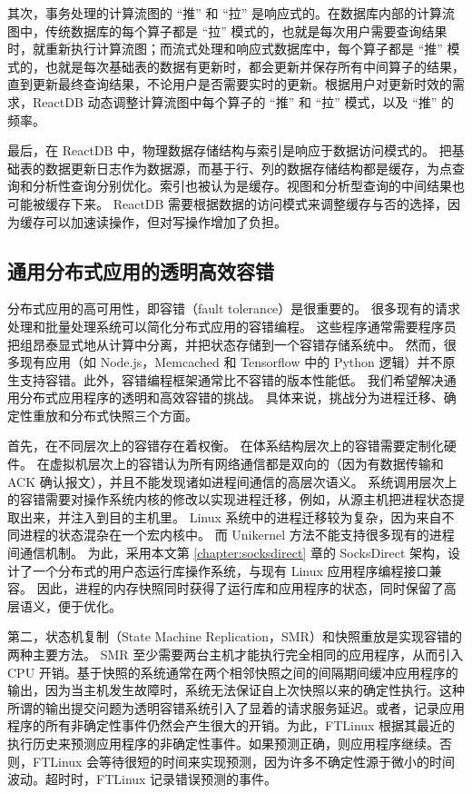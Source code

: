 其次，事务处理的计算流图的 ``推'' 和 ``拉'' 是响应式的。在数据库内部的计算流图中，传统数据库的每个算子都是 ``拉'' 模式的，也就是每次用户需要查询结果时，就重新执行计算流图；而流式处理和响应式数据库中，每个算子都是 ``推'' 模式的，也就是每次基础表的数据有更新时，都会更新并保存所有中间算子的结果，直到更新最终查询结果，不论用户是否需要实时的更新。根据用户对更新时效的需求，ReactDB 动态调整计算流图中每个算子的 ``推'' 和 ``拉'' 模式，以及 ``推'' 的频率。

最后，在 ReactDB 中，物理数据存储结构与索引是响应于数据访问模式的。
把基础表的数据更新日志作为数据源，而基于行、列的数据存储结构都是缓存，为点查询和分析性查询分别优化。索引也被认为是缓存。视图和分析型查询的中间结果也可能被缓存下来。
ReactDB 需要根据数据的访问模式来调整缓存与否的选择，因为缓存可以加速读操作，但对写操作增加了负担。

\subsection{通用分布式应用的透明高效容错}

分布式应用的高可用性，即容错（fault tolerance）是很重要的。
很多现有的请求处理和批量处理系统可以简化分布式应用的容错编程。
这些程序通常需要程序员把组昂泰显式地从计算中分离，并把状态存储到一个容错存储系统中。
然而，很多现有应用（如 Node.js，Memcached 和 Tensorflow 中的 Python 逻辑）并不原生支持容错。此外，容错编程框架通常比不容错的版本性能低。
我们希望解决通用分布式应用程序的透明和高效容错的挑战。
具体来说，挑战分为进程迁移、确定性重放和分布式快照三个方面。

首先，在不同层次上的容错存在着权衡。
在体系结构层次上的容错需要定制化硬件。
在虚拟机层次上的容错认为所有网络通信都是双向的（因为有数据传输和 ACK 确认报文），并且不能发现诸如进程间通信的高层次语义。
系统调用层次上的容错需要对操作系统内核的修改以实现进程迁移，例如，从源主机把进程状态提取出来，并注入到目的主机里。
Linux 系统中的进程迁移较为复杂，因为来自不同进程的状态混杂在一个宏内核中。
而 Unikernel 方法不能支持很多现有的进程间通信机制。
为此，采用本文第 \ref{chapter:socksdirect} 章的 SocksDirect 架构，设计了一个分布式的用户态运行库操作系统，与现有 Linux 应用程序编程接口兼容。
因此，进程的内存快照同时获得了运行库和应用程序的状态，同时保留了高层语义，便于优化。

第二，状态机复制（State Machine Replication，SMR）和快照重放是实现容错的两种主要方法。 SMR 至少需要两台主机才能执行完全相同的应用程序，从而引入 CPU 开销。基于快照的系统通常在两个相邻快照之间的间隔期间缓冲应用程序的输出，因为当主机发生故障时，系统无法保证自上次快照以来的确定性执行。这种所谓的输出提交问题为透明容错系统引入了显着的请求服务延迟。或者，记录应用程序的所有非确定性事件仍然会产生很大的开销。为此，FTLinux 根据其最近的执行历史来预测应用程序的非确定性事件。如果预测正确，则应用程序继续。否则，FTLinux 会等待很短的时间来实现预测，因为许多不确定性源于微小的时间波动。超时时，FTLinux 记录错误预测的事件。

